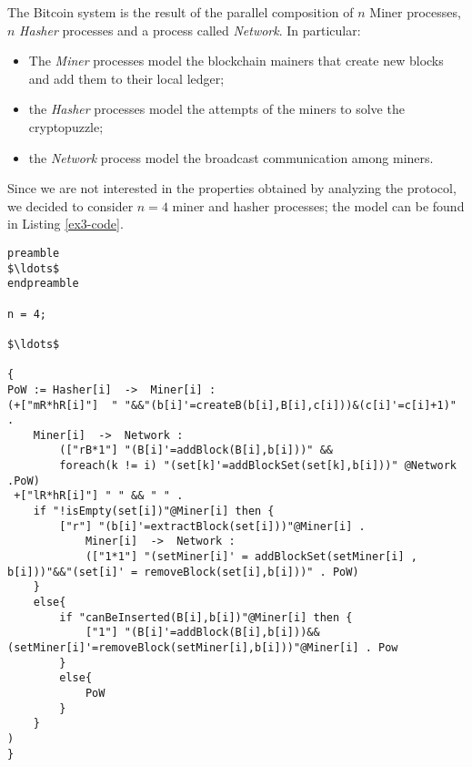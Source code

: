 The Bitcoin system is the result of the parallel composition of $n$ Miner processes, $n$  \emph{Hasher} processes and a process called \emph{Network}.
In particular: 
\begin{itemize}
	\item The \emph{Miner} processes model the blockchain mainers that create new blocks and add them to their local ledger;
	\item the \emph{Hasher} processes model the attempts of the miners to solve the cryptopuzzle;
	\item the \emph{Network} process model the broadcast communication among miners. 
\end{itemize}
Since we are not interested in the properties obtained by analyzing the protocol, we decided to consider $n=4$ miner and hasher processes; the model can be found in Listing \ref{ex3-code}.

\begin{lstlisting}[style=chor-color,breaklines=true, postbreak=\mbox{\textcolor{red}{$\hookrightarrow$}\space},caption={Choreographic language for the Proof of Work Bitcoin Protocol.},captionpos=b,label={ex3-code}]
preamble
$\ldots$
endpreamble

n = 4;

$\ldots$
	
{
PoW := Hasher[i]  ->  Miner[i] :
(+["mR*hR[i]"]  " "&&"(b[i]'=createB(b[i],B[i],c[i]))&(c[i]'=c[i]+1)" . 
	Miner[i]  ->  Network : 
		(["rB*1"] "(B[i]'=addBlock(B[i],b[i]))" && 
		foreach(k != i) "(set[k]'=addBlockSet(set[k],b[i]))" @Network .PoW)
 +["lR*hR[i]"] " " && " " .
 	if "!isEmpty(set[i])"@Miner[i] then { 
  		["r"] "(b[i]'=extractBlock(set[i]))"@Miner[i] . 
			Miner[i]  ->  Network : 
			(["1*1"] "(setMiner[i]' = addBlockSet(setMiner[i] , b[i]))"&&"(set[i]' = removeBlock(set[i],b[i]))" . PoW) 
 	}
 	else{
 		if "canBeInserted(B[i],b[i])"@Miner[i] then { 
 			["1"] "(B[i]'=addBlock(B[i],b[i]))&&(setMiner[i]'=removeBlock(setMiner[i],b[i]))"@Miner[i] . Pow 
 		}
 		else{
 			PoW
		}
	}
)
} 	
\end{lstlisting}

